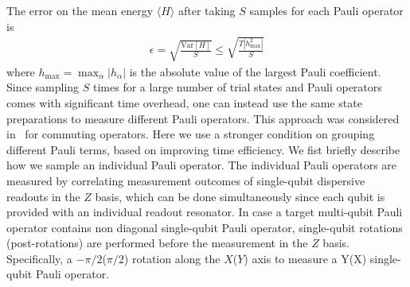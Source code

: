 \documentclass[twocolumn]{revtex4-1}
\newcommand{\1}{\mathbbm{1}}
\begin{document}
The error on the mean energy $\langle H\rangle$ after taking $S$ samples for each Pauli operator is 
\begin{align}
\label{ErrMean}
\epsilon=\sqrt{\frac{\textrm{Var}[ H]}{S}}\leq \sqrt{\frac{T|h_\textrm{max}^2|}{S}}
\end{align}
where $h_{\textrm{max}}=\max_{\alpha} |h_\alpha|$ is the absolute value of the largest Pauli coefficient. Since sampling $S$ times for a large number of trial states and Pauli operators comes with significant time overhead, one can instead use the same state preparations to measure different Pauli operators. This approach was considered in~\cite{mcclean2016theoryS} for commuting operators. Here we use a stronger condition on grouping different Pauli terms, based on improving time efficiency. 
We fist briefly describe how we sample an individual Pauli operator. The individual Pauli operators are measured by correlating measurement outcomes of single-qubit dispersive readouts in the $Z$ basis, which can be done simultaneously since each qubit is provided with an individual readout resonator. In case a target multi-qubit Pauli operator contains non diagonal single-qubit Pauli operator, single-qubit rotations (post-rotations) are performed before the measurement in the $Z$ basis. Specifically, a $-\pi/2$($\pi/2$) rotation along the $X$($Y$) axis to measure a Y(X) single-qubit Pauli operator. 
\end{document}
